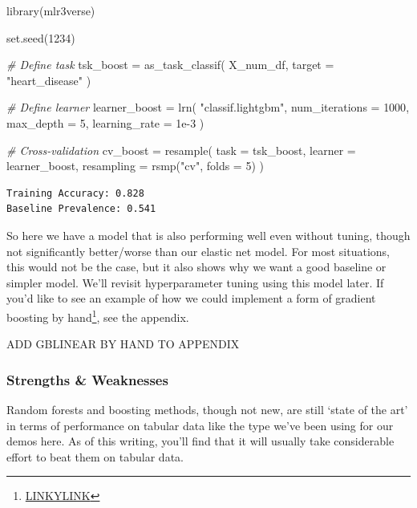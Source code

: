 \documentclass[
  letterpaper,
]{krantz}
\newenvironment{Shaded}{}{}
\newcommand{\AttributeTok}[1]{\textcolor[rgb]{0.49,0.56,0.16}{#1}}
\newcommand{\CommentTok}[1]{\textcolor[rgb]{0.38,0.63,0.69}{\textit{#1}}}
\newcommand{\DecValTok}[1]{\textcolor[rgb]{0.25,0.63,0.44}{#1}}
\newcommand{\FloatTok}[1]{\textcolor[rgb]{0.25,0.63,0.44}{#1}}
\newcommand{\FunctionTok}[1]{\textcolor[rgb]{0.02,0.16,0.49}{#1}}
\newcommand{\NormalTok}[1]{#1}
\newcommand{\OtherTok}[1]{\textcolor[rgb]{0.00,0.44,0.13}{#1}}
\newcommand{\StringTok}[1]{\textcolor[rgb]{0.25,0.44,0.63}{#1}}
\DeclareRobustCommand{\href}[2]{#2\footnote{\url{#1}}}
\begin{document}
\begin{Shaded}
\begin{Highlighting}[]
\FunctionTok{library}\NormalTok{(mlr3verse)}

\FunctionTok{set.seed}\NormalTok{(}\DecValTok{1234}\NormalTok{)}

\CommentTok{\# Define task}
\NormalTok{tsk\_boost }\OtherTok{=} \FunctionTok{as\_task\_classif}\NormalTok{(}
\NormalTok{    X\_num\_df,}
    \AttributeTok{target =} \StringTok{"heart\_disease"}
\NormalTok{)}

\CommentTok{\# Define learner}
\NormalTok{learner\_boost }\OtherTok{=} \FunctionTok{lrn}\NormalTok{(}
  \StringTok{"classif.lightgbm"}\NormalTok{,}
  \AttributeTok{num\_iterations =} \DecValTok{1000}\NormalTok{,}
  \AttributeTok{max\_depth =} \DecValTok{5}\NormalTok{,}
  \AttributeTok{learning\_rate =} \FloatTok{1e{-}3}
\NormalTok{)}


\CommentTok{\# Cross{-}validation}
\NormalTok{cv\_boost }\OtherTok{=} \FunctionTok{resample}\NormalTok{(}
    \AttributeTok{task       =}\NormalTok{ tsk\_boost,}
    \AttributeTok{learner    =}\NormalTok{ learner\_boost,}
    \AttributeTok{resampling =} \FunctionTok{rsmp}\NormalTok{(}\StringTok{"cv"}\NormalTok{, }\AttributeTok{folds =} \DecValTok{5}\NormalTok{)}
\NormalTok{)}
\end{Highlighting}
\end{Shaded}

\begin{verbatim}
Training Accuracy: 0.828
Baseline Prevalence: 0.541
\end{verbatim}

So here we have a model that is also performing well even without
tuning, though not significantly better/worse than our elastic net
model. For most situations, this would not be the case, but it also
shows why we want a good baseline or simpler model. We'll revisit
hyperparameter tuning using this model later. If you'd like to see an
example of how we could implement a form of \href{LINKYLINK}{gradient
boosting by hand}, see the appendix.

ADD GBLINEAR BY HAND TO APPENDIX

\subsubsection{Strengths \& Weaknesses}\label{strengths-weaknesses-1}

Random forests and boosting methods, though not new, are still `state of
the art' in terms of performance on tabular data like the type we've
been using for our demos here. As of this writing, you'll find that it
will usually take considerable effort to beat them on tabular data.
\end{document}
